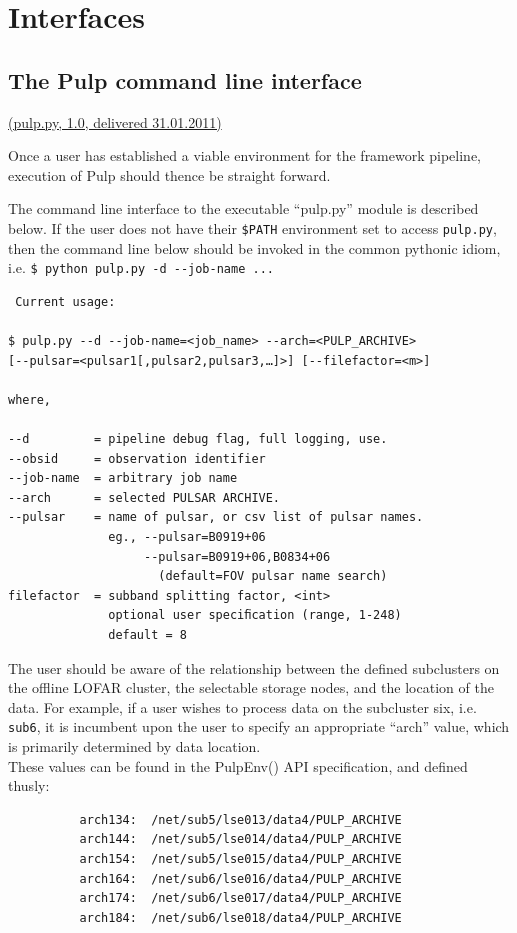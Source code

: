 \documentclass[a4paper,10pt,bibtotoc]{scrartcl}
\begin{document}
\section{Interfaces}
\label{sec:interfaces}
\subsection{The Pulp command line interface}

\underline{(pulp.py, 1.0, delivered 31.01.2011)}

Once a user has established a viable environment for the framework pipeline, execution of Pulp should thence be straight forward.

The command line interface to the executable ``pulp.py'' module is described below.  If the user does not have their \verb|$PATH| environment set to access \verb|pulp.py|, then the command line below should be invoked in the common pythonic idiom,\\
 i.e. \verb|$ python pulp.py -d --job-name ...|\\
\begin{verbatim}
 Current usage:

$ pulp.py --d --job-name=<job_name> --arch=<PULP_ARCHIVE>
[--pulsar=<pulsar1[,pulsar2,pulsar3,…]>] [--filefactor=<m>]

where,

--d         = pipeline debug flag, full logging, use.
--obsid     = observation identifier          
--job-name  = arbitrary job name             
--arch      = selected PULSAR ARCHIVE.
--pulsar    = name of pulsar, or csv list of pulsar names.
              eg., --pulsar=B0919+06
                   --pulsar=B0919+06,B0834+06
                     (default=FOV pulsar name search)
filefactor  = subband splitting factor, <int>
              optional user speciﬁcation (range, 1-248)
              default = 8
\end{verbatim}
The user should be aware of the relationship between the defined subclusters on the offline LOFAR cluster, the selectable storage nodes, and the location of the data.  For example, if a user wishes to process data on the subcluster six, i.e. \verb|sub6|, it is incumbent upon the user to specify an appropriate ``arch'' value,  which is primarily determined by data location.  \\
These values can be found in the PulpEnv() API specification, and defined thusly:
\begin{verbatim}
          arch134:  /net/sub5/lse013/data4/PULP_ARCHIVE
          arch144:  /net/sub5/lse014/data4/PULP_ARCHIVE
          arch154:  /net/sub5/lse015/data4/PULP_ARCHIVE
          arch164:  /net/sub6/lse016/data4/PULP_ARCHIVE
          arch174:  /net/sub6/lse017/data4/PULP_ARCHIVE
          arch184:  /net/sub6/lse018/data4/PULP_ARCHIVE
\end{verbatim}
\end{document}
